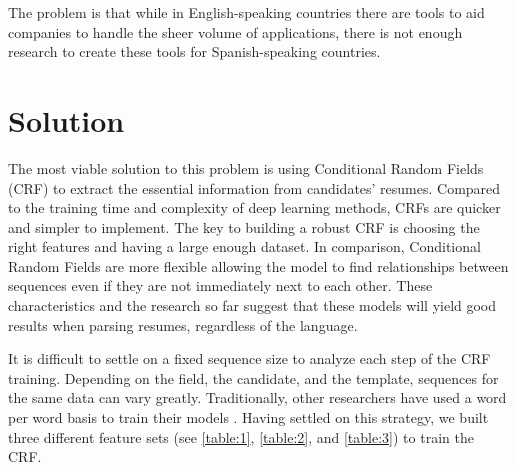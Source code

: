 \documentclass[a4paper, conference]{ieeeconf}
\begin{document}
  \medskip
  The problem is that while in English-speaking countries there are tools to
  aid companies to handle the sheer volume of applications, there is not enough
  research to create these tools for Spanish-speaking countries.

  \section{Solution}
  The most viable solution to this problem is using Conditional Random Fields
  (CRF) to extract the essential information from candidates' resumes. Compared
  to the training time and complexity of deep learning methods, CRFs are
  quicker and simpler to implement. The key to building a robust CRF is
  choosing the right features and having a large enough dataset. In comparison,
  Conditional Random Fields are more flexible allowing the model to find
  relationships between sequences even if they are not immediately next to each
  other. These characteristics and the research so far suggest that these
  models will yield good results when parsing resumes, regardless of the
  language.

  It is difficult to settle on a fixed sequence size to analyze each step of
  the CRF training. Depending on the field, the candidate, and the template,
  sequences for the same data can vary greatly. Traditionally, other
  researchers have used a word per word basis to train their models
  \cite{Ayishathahira2018a,E*2020}. Having settled on this strategy, we
  built three different feature sets (see \ref{table:1}, \ref{table:2}, and
  \ref{table:3}) to train the CRF.
\end{document}
